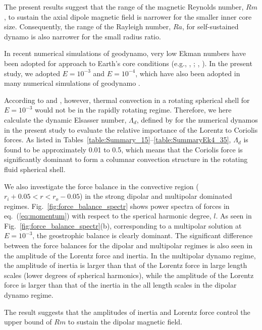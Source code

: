 The present results suggest that the range of the magnetic Reynolds number, $Rm$, to sustain the axial dipole magnetic field is narrower for the smaller inner core size.
Consequently, the range of the Rayleigh number, $Ra$, for self-sustained dynamo is also narrower for the small radius ratio.



In recent numerical simulations of geodynamo, very low Ekman numbers have been adopted for approach to Earth's core conditions (e.g., \citeauthor{Aubert:2019}, \citeyear{Aubert:2019}; 
\citeauthor{Schaeffer:2017}, \citeyear{Schaeffer:2017}).
In the present study, we adopted $E = 10^{-3}$ and $E = 10^{-4}$,
which have also been adopted in many numerical simulations of geodynamo \citep{Pena:2018}.

According to \citet{Gastine:2016} and \citet{Long:2020}, however, thermal convection in a rotating spherical shell for $E = 10^{-3}$ would not be in the rapidly rotating regime.
Therefore, we here calculate the dynamic Elsasser number, $\Lambda_d$, defined by \citet{Soderlund:2012} for the numerical dynamos in the present study to evaluate the relative importance of the Lorentz to Coriolis forces. 
As listed in Tables~\ref{table:Summary_15}--\ref{table:SummaryEk4_35}, $\Lambda_d$ is found to be approximately 0.01 to 0.5, which means that the Coriolis force is significantly dominant to form a columnar convection structure in the rotating fluid spherical shell.

We also investigate the force balance in the convective region ($r_{i} + 0.05 < r < r_{o} - 0.05$) in the strong dipolar and multipolar dominated regimes.
Fig.~\ref{fig:force_balance_spectr} shows power spectra of forces in eq.~(\ref{eq:momentum}) with respect to the sperical harmonic degree, $l$.
As seen in Fig.~\ref{fig:force_balance_spectr}(b), corresponding to a multipolar solution at $E = 10^{-3}$, the geostrophic balance is clearly dominant.
The significant difference between the force balances for the dipolar and multipolar regimes is also seen in the amplitude of the Lorentz force and inertia.
In the multipolar dynamo regime, the amplitude of inertia is larger than that of the Lorentz force in large length scales (lower degrees of spherical harmonics), while the amplitude of the Lorentz force is larger than that of the inertia in the all length scales in the dipolar dynamo regime.

The result suggests that the amplitudes of inertia and Lorentz force control the upper bound of $Rm$ to sustain the dipolar magnetic field.



